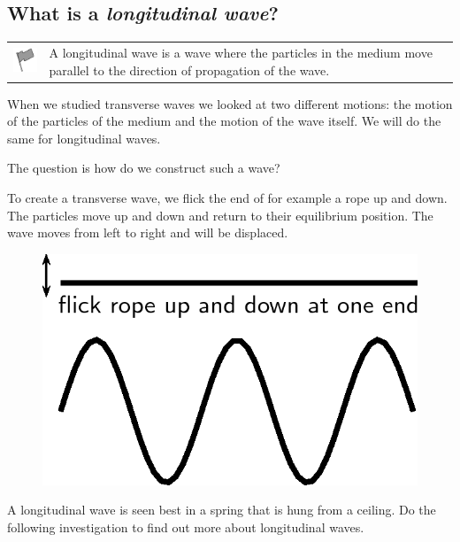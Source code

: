             \subsection{ What is a \textsl{longitudinal wave}?}
            \nopagebreak
\par
            \label{m38782*fhsst!!!underscore!!!id64}\begin{definition}
	  \begin{tabular*}{15 cm}{m{15 mm}m{}}
	\hspace*{-50pt}  \includegraphics[width=0.5in]{col11305.imgs/psflag2.png}   & \Definition{   \label{id2444157}\textbf{ Longitudinal waves }} { \label{m38782*meaningfhsst!!!underscore!!!id64}
      A longitudinal wave is a wave where the particles in the medium move parallel to the direction of propagation of the wave. 
       } 
      \end{tabular*}
      \end{definition}
      \label{m38782*id292159}When we studied transverse waves we looked at two different motions: the motion of the particles of the medium and the motion of the wave itself. We will do the same for longitudinal waves.\par 
      \label{m38782*id292164}The question is how do we construct such a wave?\par 
      \label{m38782*id292167}To create a transverse wave, we flick the end of for example a rope up and down. The particles move up and down and return to their equilibrium position. The wave moves from left to right and will be displaced.\par 
      \label{m38782*id292172}
    \setcounter{subfigure}{0}
	\begin{figure}[H] %
    \begin{center}
    \label{m38782*id292175!!!underscore!!!media}\label{m38782*id292175!!!underscore!!!printimage}\includegraphics[width=0.4\columnwidth]{col11305.imgs/m38782_PG11C4_001.png} %
      \vspace{2pt}
    \vspace{.1in}
    \end{center}
 \end{figure}       
      \par 
      \label{m38782*id292181}A longitudinal wave is seen best in a spring that is hung from a ceiling. Do the following investigation to find out more about longitudinal waves.\par 
\label{m38782*secfhsst!!!underscore!!!id79}

